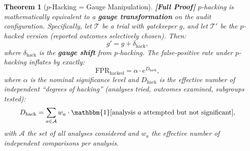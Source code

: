 \documentclass[12pt,a4paper]{article}
\newtheorem{theorem}{Theorem}[section]
\theoremstyle{remark}
\newcommand{\rigorFull}{\textbf{[Full Proof]}}
\begin{document}
\begin{theorem}[$p$-Hacking = Gauge Manipulation]
\label{thm:phacking_gauge}
\rigorFull
$p$-hacking is mathematically equivalent to a \textbf{gauge transformation}
on the audit configuration. Specifically, let $\mathcal{T}$ be a trial
with gatekeeper $g$, and let $\mathcal{T}'$ be the $p$-hacked version
(reported outcomes selectively chosen). Then:
\begin{equation}
  g' = g + \delta_{\text{hack}},
\end{equation}
where $\delta_{\text{hack}}$ is the \textbf{gauge shift} from p-hacking.
The false-positive rate under $p$-hacking inflates by exactly:
\begin{equation}
  \text{FPR}_{\text{hacked}} = \alpha \cdot e^{D_{\text{hack}}},
\end{equation}
where $\alpha$ is the nominal significance level and $D_{\text{hack}}$
is the effective number of independent ``degrees of hacking'' (analyses
tried, outcomes examined, subgroups tested):
\begin{equation}
  D_{\text{hack}} = \sum_{a \in \mathcal{A}} w_a \cdot \mathbbm{1}
  [\text{analysis } a \text{ attempted but not significant}],
\end{equation}
with $\mathcal{A}$ the set of all analyses considered and $w_a$ the
effective number of independent comparisons per analysis.
\end{theorem}
\end{document}
